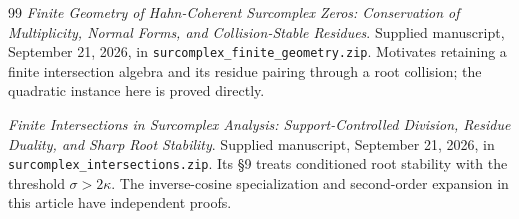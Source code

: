 \documentclass[11pt,letterpaper]{article}
\theoremstyle{definition}
\theoremstyle{remark}
\numberwithin{equation}{section}
\begin{document}
\begin{thebibliography}{99}
\emph{Finite Geometry of Hahn-Coherent Surcomplex Zeros:
Conservation of Multiplicity, Normal Forms, and Collision-Stable Residues}.
Supplied manuscript, September 21, 2026, in
\texttt{surcomplex\_finite\_geometry.zip}.
Motivates retaining a finite intersection algebra and its residue pairing through a root collision; the quadratic instance here is proved directly.

\emph{Finite Intersections in Surcomplex Analysis:
Support-Controlled Division, Residue Duality, and Sharp Root Stability}.
Supplied manuscript, September 21, 2026, in
\texttt{surcomplex\_intersections.zip}.
Its \S9 treats conditioned root stability with the threshold $\sigma>2\kappa$. The inverse-cosine specialization and second-order expansion in this article have independent proofs.

\end{thebibliography}
\end{document}
